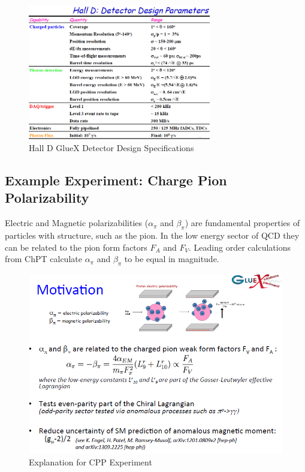             \begin{figure}[H]
                \centering
                \includegraphics[width=8cm]{CLAS-12/modules/jlab/Other_Halls/HallD/Hall_Design/hall_d_design_params.PNG}
                \caption{Hall D GlueX Detector Design Specifications}
            \end{figure}
            
        \subsection{Example Experiment: Charge Pion Polarizability}
        Electric and Magnetic polarizabilities ($\alpha_{\pi}$ and $\beta_{\pi}$) are fundamental properties of particles with structure, such as the pion. In the low energy sector of QCD they can be related to the pion form factors $F_A$ and $F_V$. Leading order calculations from ChPT calculate $\alpha_{\pi}$ and $\beta_{\pi}$ to be equal in magnitude. 
        
        \begin{figure}[H]
            \centering
            \includegraphics[width=12cm]{CLAS-12/modules/jlab/Other_Halls/HallD/cpp/cpp_motivation.PNG}
            \caption{Explanation for CPP Experiment}
        \end{figure}
            
